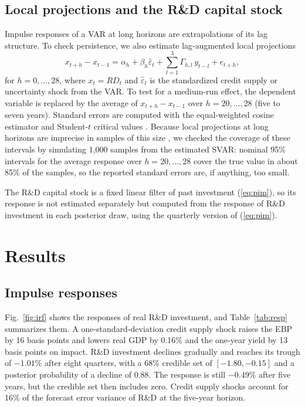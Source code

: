 \documentclass[conference]{IEEEtran}
\begin{document}
\subsection{Local projections and the R\&D capital stock}
Impulse responses of a VAR at long horizons are extrapolations of its lag
structure. To check persistence, we also estimate lag-augmented local
projections \cite{jorda2005,montiel2021}
\begin{equation}
x_{t+h}-x_{t-1}=\alpha_h+\beta_h\hat\varepsilon_t+\sum_{l=1}^{3}\Gamma_{h,l}\,y_{t-l}+e_{t+h},
\label{eq:lp}
\end{equation}
for $h=0,\dots,28$, where $x_t=\mathit{RD}_t$ and $\hat\varepsilon_t$ is the
standardized credit supply or uncertainty shock from the VAR. To test for a
medium-run effect, the dependent variable is replaced by the average of
$x_{t+h}-x_{t-1}$ over $h=20,\dots,28$ (five to seven years). Standard errors
are computed with the equal-weighted cosine estimator and Student-$t$ critical
values \cite{lazarus2018}. Because local projections at long horizons are
imprecise in samples of this size \cite{kilian2011}, we checked the coverage of
these intervals by simulating 1{,}000 samples from the estimated SVAR: nominal
95\% intervals for the average response over $h=20,\dots,28$ cover the true
value in about 85\% of the samples, so the reported standard errors are, if
anything, too small.

The R\&D capital stock is a fixed linear filter of past investment
(\ref{eq:pim}), so its response is not estimated separately but computed from
the response of R\&D investment in each posterior draw, using the quarterly
version of (\ref{eq:pim}).

\section{Results}

\subsection{Impulse responses}
Fig.~\ref{fig:irf} shows the responses of real R\&D investment, and
Table~\ref{tab:resp} summarizes them. A one-standard-deviation credit supply
shock raises the EBP by 16 basis points and lowers real GDP by 0.16\% and the
one-year yield by 13 basis points on impact. R\&D investment declines
gradually and reaches its trough of $-1.01\%$ after eight quarters, with a 68\%
credible set of $[-1.80,-0.15]$ and a posterior probability of a decline of
0.88. The response is still $-0.49\%$ after five years, but the credible set
then includes zero. Credit supply shocks account for 16\% of the forecast error
variance of R\&D at the five-year horizon.
\end{document}

